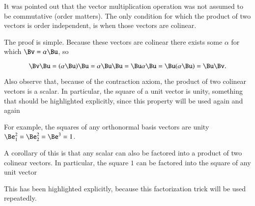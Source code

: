 %
%
It was pointed out that the vector multiplication operation was not assumed to be commutative (order matters).  The only condition for which the product of two vectors is order independent, is when those vectors are colinear.


The proof is simple.  Because these vectors are colinear there exists some \( \alpha \) for which \( \Bv = \alpha \Bu \), so

\begin{dmath}\label{eqn:multivector:380}
\Bv \Bu
=
(\alpha \Bu) \Bu
=
\alpha \Bu \Bu
=
\Bu \alpha \Bu
=
\Bu (\alpha \Bu)
=
\Bu \Bv.
\end{dmath}

Also observe that, because of the contraction axiom, the product of two colinear vectors is a scalar.  In particular, the square of a unit vector is unity, something that should be highlighted explicitly, since this property will be used again and again

For example, the squares of any orthonormal basis vectors are unity \( \Be_1^2 = \Be_2^2 = \Be^3 = 1 \).

A corollary of this is that any scalar can also be factored into a product of two colinear vectors.
In particular, the square \( 1 \) can be factored into the square of any unit vector


This has been highlighted explicitly, because this factorization trick will be used repeatedly.
